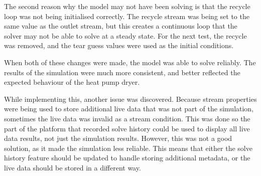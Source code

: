 The second reason why the model may not have been solving is that the recycle loop was not being initialised correctly. The recycle stream was being set to the same value as the outlet stream, but this creates a continuous loop that the solver may not be able to solve at a steady state. For the next test, the recycle was removed, and the tear guess values were used as the initial conditions. 


When both of these changes were made, the model was able to solve reliably. The results of the simulation were much more consistent, and better reflected the expected behaviour of the heat pump dryer.


While implementing this, another issue was discovered. Because stream properties were being used to store additional live data that was not part of the simulation, sometimes the live data was invalid as a stream condition. This was done so the part of the platform that recorded solve history could be used to display all live data results, not just the simulation results. However, this was not a good solution, as it made the simulation less reliable. This means that either the solve history feature should be updated to handle storing additional metadata, or the live data should be stored in a different way.






